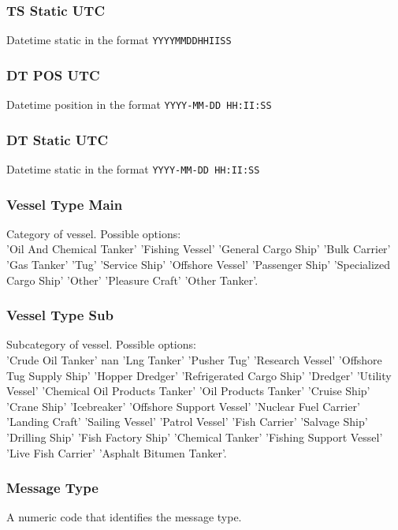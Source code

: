         \subsubsection{TS Static UTC}
            Datetime static in the format \verb|YYYYMMDDHHIISS|
        \subsubsection{DT POS UTC}
            Datetime position in the format \verb|YYYY-MM-DD HH:II:SS|
        \subsubsection{DT Static UTC}
            Datetime static in the format \verb|YYYY-MM-DD HH:II:SS|
        \subsubsection{Vessel Type Main}
            Category of vessel. Possible options:\\ 'Oil And Chemical Tanker' 'Fishing Vessel' 'General Cargo Ship' 'Bulk Carrier' 'Gas Tanker' 'Tug' 'Service Ship' 'Offshore Vessel' 'Passenger Ship' 'Specialized Cargo Ship' 'Other' 'Pleasure Craft' 'Other Tanker'.
        \subsubsection{Vessel Type Sub}
            Subcategory of vessel. Possible options:\\ 'Crude Oil Tanker' nan 'Lng Tanker' 'Pusher Tug' 'Research Vessel' 'Offshore Tug Supply Ship' 'Hopper Dredger' 'Refrigerated Cargo Ship' 'Dredger' 'Utility Vessel' 'Chemical Oil Products Tanker' 'Oil Products Tanker' 'Cruise Ship' 'Crane Ship' 'Icebreaker' 'Offshore Support Vessel' 'Nuclear Fuel Carrier' 'Landing Craft' 'Sailing Vessel' 'Patrol Vessel' 'Fish Carrier' 'Salvage Ship' 'Drilling Ship' 'Fish Factory Ship' 'Chemical Tanker' 'Fishing Support Vessel' 'Live Fish Carrier' 'Asphalt Bitumen Tanker'.
        \subsubsection{Message Type}
            A numeric code that identifies the message type.
    
    
